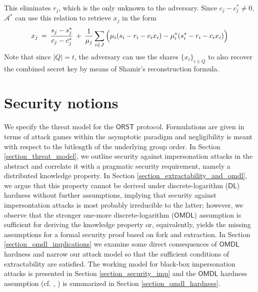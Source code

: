 \documentclass[10pt, psamsfonts, reqno]{amsart}
\theoremstyle{definition}
\theoremstyle{remark}
\numberwithin{equation}{section}
\begin{document}
This eliminates $r_j$,
which is the only unknown to the adversary.
Since $c_j - c_j^* \neq 0$,
$\mathcal{A}^*$ can use this relation to retrieve
$x_j$ in the form
\vspace{5pt}
\begin{equation}\label{orst_key_recovery}
x_j
\hspace{2pt}
=
\hspace{2pt}
\frac{s_j - s_j^*}{c_j - c_j^*}
\hspace{2pt}
+
\hspace{2pt}
\frac{1}{\mu_j} \sum_{i \in J}
\hspace{0pt}
\Big(
	\mu_i (s_i - r_i - c_i x_i) -
	\mu_i^* (s_i^* - r_i - c_i x_i)
\Big)\hspace{1pt}
\vspace{5pt}
\end{equation}
\noindent
Note that since $|Q| = t$, the adversary can use
the shares $\{x_i\}_{i \in Q}$
to also recover the combined secret key
by means of Shamir's reconstruction formula.

\section{Security notions}\label{section_security_notions}

\noindent
We specify the threat model for the
$\mathsf{ORST}$ protocol.
Formulations are given in terms of attack games within the
asymptotic paradigm and negligibility
is meant with respect to the bitlength
of the underlying group order.
In Section \ref{section_threat_model}, we outline
security against impersonation attacks in the abstract
and correlate it with a pragmatic security requirement,
namely a distributed knowledge property.
In Section \ref{section_extractability_and_omdl},
we argue that this property cannot be derived
under discrete-logarithm ($\mathsf{DL}$) hardness
without further assumptions,
implying that security against impersontation
attacks is most probably irreducible
to the latter;
however, we observe that the stronger
one-more discrete-logarithm ($\mathsf{OMDL}$) assumption
is sufficient for deriving the knowledge property or,
equivalently, yields the missing assumptions
for a formal security proof based on fork and extraction.
In Section \ref{section_omdl_implications}
we examine some direct consequences of $\mathsf{OMDL}$ hardness
and narrow our attack model
so that the sufficient conditions of extractability are satisfied.
The working model for black-box impersonation attacks is presented
in Section \ref{section_security_imp}
and the $\mathsf{OMDL}$ hardness assumption
(cf. \cite{paper_bellare_palacio}, \cite{paper_bellare_omdl})
is summarized in Section
\ref{section_omdl_hardness}.
\end{document}
